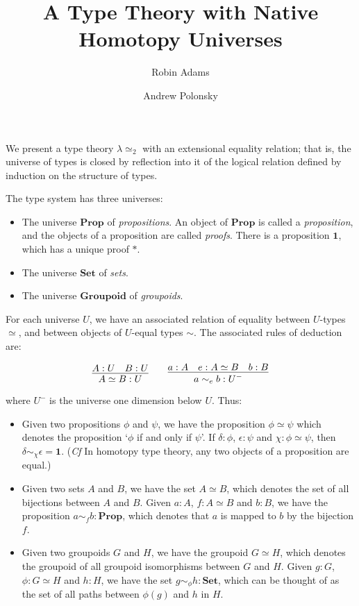 \documentclass{easychair}
\title{A Type Theory with Native Homotopy Universes}
\author{Robin Adams\inst{1} \and Andrew Polonsky\inst{2}}
\institute{Universitetet i Bergen \and University Paris Diderot}
\newcommand{\Prop}{\ensuremath{\mathbf{Prop}}}
\newcommand{\Set}{\ensuremath{\mathbf{Set}}}
\newcommand{\Groupoid}{\ensuremath{\mathbf{Groupoid}}}
\newcommand{\LEtwo}{\ensuremath{\lambda \simeq_2}}
\begin{document}
\maketitle

We present a type theory $\LEtwo$ with an extensional equality relation; that is, the universe of types is closed by reflection into it of the logical relation defined by induction on the structure of types.

The type system has three universes:
\begin{itemize}
\item
The universe $\Prop$ of \emph{propositions}.  An object of $\Prop$ is
called a \emph{proposition}, and the objects of a proposition are
called \emph{proofs}.  There is a proposition $\mathbf{1}$, which has
a unique proof $*$.
\item
The universe $\Set$ of \emph{sets}.
\item
The universe $\Groupoid$ of \emph{groupoids}.
\end{itemize}

For each universe $U$, we have an associated relation of equality
between $U$-types $\simeq$, and between objects of $U$-equal
types $\sim$.  The associated rules of deduction are:

\[ \infer{A \simeq B : U}{A : U \quad B : U}
\qquad
\infer{a \sim_e b : U^-}{a : A \quad e : A \simeq B \quad b : B} \]

where $U^-$ is the universe one dimension below $U$.  Thus:
\begin{itemize}
\item
Given two propositions $\phi$ and $\psi$, we have the proposition $\phi \simeq \psi$ which denotes the proposition `$\phi$ if and only if $\psi$'.  If $\delta : \phi$, $\epsilon : \psi$ and $\chi : \phi \simeq \psi$, then $\delta \sim_\chi \epsilon = \mathbf{1}$.  (\emph{Cf} In homotopy type theory, any two objects of a proposition are equal.)
\item
Given two sets $A$ and $B$, we have the set $A \simeq B$, which denotes the set of all bijections between $A$ and $B$.  Given $a : A$, $f : A \simeq B$ and $b : B$, we have the proposition $a \sim_f b : \Prop$, which denotes that $a$ is mapped to $b$ by the bijection $f$.
\item
Given two groupoids $G$ and $H$, we have the groupoid $G \simeq H$, which denotes the groupoid of all groupoid isomorphisms between $G$ and $H$.  Given $g : G$, $\phi : G \simeq H$ and $h : H$, we have the set $g \sim_\phi h : \Set$, which can be thought of as the set of all paths between $\phi(g)$ and $h$ in $H$.
\end{itemize}
\end{document}
